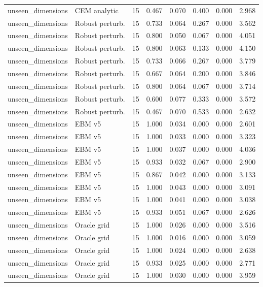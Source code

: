 {\begin{longtable}{llrrrrrr}
unseen\_dimensions & CEM analytic & 15 & 0.467 & 0.070 & 0.400 & 0.000 & 2.968 \\
unseen\_dimensions & Robust perturb. & 15 & 0.733 & 0.064 & 0.267 & 0.000 & 3.562 \\
unseen\_dimensions & Robust perturb. & 15 & 0.800 & 0.050 & 0.067 & 0.000 & 4.051 \\
unseen\_dimensions & Robust perturb. & 15 & 0.800 & 0.063 & 0.133 & 0.000 & 4.150 \\
unseen\_dimensions & Robust perturb. & 15 & 0.733 & 0.066 & 0.267 & 0.000 & 3.779 \\
unseen\_dimensions & Robust perturb. & 15 & 0.667 & 0.064 & 0.200 & 0.000 & 3.846 \\
unseen\_dimensions & Robust perturb. & 15 & 0.800 & 0.064 & 0.067 & 0.000 & 3.714 \\
unseen\_dimensions & Robust perturb. & 15 & 0.600 & 0.077 & 0.333 & 0.000 & 3.572 \\
unseen\_dimensions & Robust perturb. & 15 & 0.467 & 0.070 & 0.533 & 0.000 & 2.632 \\
unseen\_dimensions & EBM v5 & 15 & 1.000 & 0.034 & 0.000 & 0.000 & 2.601 \\
unseen\_dimensions & EBM v5 & 15 & 1.000 & 0.033 & 0.000 & 0.000 & 3.323 \\
unseen\_dimensions & EBM v5 & 15 & 1.000 & 0.037 & 0.000 & 0.000 & 4.036 \\
unseen\_dimensions & EBM v5 & 15 & 0.933 & 0.032 & 0.067 & 0.000 & 2.900 \\
unseen\_dimensions & EBM v5 & 15 & 0.867 & 0.042 & 0.000 & 0.000 & 3.133 \\
unseen\_dimensions & EBM v5 & 15 & 1.000 & 0.043 & 0.000 & 0.000 & 3.091 \\
unseen\_dimensions & EBM v5 & 15 & 1.000 & 0.041 & 0.000 & 0.000 & 3.038 \\
unseen\_dimensions & EBM v5 & 15 & 0.933 & 0.051 & 0.067 & 0.000 & 2.626 \\
unseen\_dimensions & Oracle grid & 15 & 1.000 & 0.026 & 0.000 & 0.000 & 3.516 \\
unseen\_dimensions & Oracle grid & 15 & 1.000 & 0.016 & 0.000 & 0.000 & 3.059 \\
unseen\_dimensions & Oracle grid & 15 & 1.000 & 0.024 & 0.000 & 0.000 & 2.638 \\
unseen\_dimensions & Oracle grid & 15 & 0.933 & 0.025 & 0.000 & 0.000 & 2.771 \\
unseen\_dimensions & Oracle grid & 15 & 1.000 & 0.030 & 0.000 & 0.000 & 3.959 \\

\end{longtable}}

